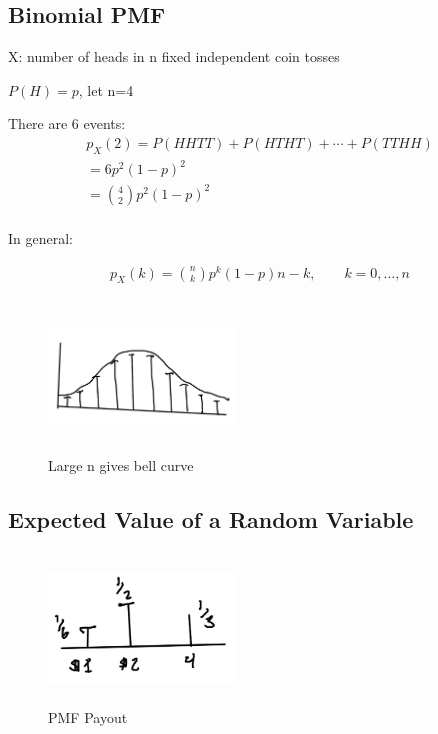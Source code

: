 \subsection{Binomial PMF}


X: number of heads in n fixed independent coin tosses

$P(H)=p$, let n=4

There are 6 events:
\begin{align*}
p_X(2)=P(HHTT) + P(HTHT) + \cdots + P(TTHH)\\
=6p^2(1-p)^2 \\
=\binom{4}{2} p^2(1-p)^2 \\
\end{align*}

In general:

\begin{align}
p_X(k)=\binom{n}{k} p^k(1-p)n-k, \qquad k=0,\ldots,n
\end{align}



\begin{figure}[ht]
\centering
\includegraphics[width=5cm, height=4cm]{images/L05/bern_norm_approx.jpeg}
\caption{Large n gives bell curve}
\end{figure}

\subsection{Expected Value of a Random Variable}


\begin{figure}[ht]
\centering
\includegraphics[width=5cm, height=4cm]{images/L05/EX_rv.jpeg}
\caption{PMF Payout}
\end{figure}

